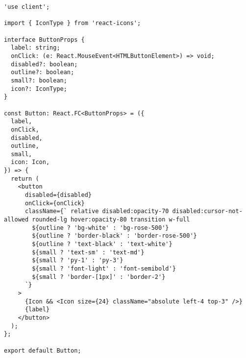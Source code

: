 \begin{verbatim}
'use client';

import { IconType } from 'react-icons';

interface ButtonProps {
  label: string;
  onClick: (e: React.MouseEvent<HTMLButtonElement>) => void;
  disabled?: boolean;
  outline?: boolean;
  small?: boolean;
  icon?: IconType;
}

const Button: React.FC<ButtonProps> = ({
  label,
  onClick,
  disabled,
  outline,
  small,
  icon: Icon,
}) => {
  return (
    <button
      disabled={disabled}
      onClick={onClick}
      className={` relative disabled:opacity-70 disabled:cursor-not-allowed rounded-lg hover:opacity-80 transition w-full
        ${outline ? 'bg-white' : 'bg-rose-500'}
        ${outline ? 'border-black' : 'border-rose-500'}
        ${outline ? 'text-black' : 'text-white'}
        ${small ? 'text-sm' : 'text-md'}
        ${small ? 'py-1' : 'py-3'}
        ${small ? 'font-light' : 'font-semibold'}
        ${small ? 'border-[1px]' : 'border-2'}
      `}
    >
      {Icon && <Icon size={24} className="absolute left-4 top-3" />}
      {label}
    </button>
  );
};

export default Button;

\end{verbatim}